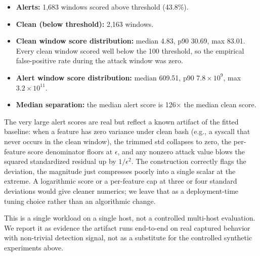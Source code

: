 \begin{itemize}
\item \textbf{Alerts:} 1{,}683 windows scored above threshold (43.8\%).
\item \textbf{Clean (below threshold):} 2{,}163 windows.
\item \textbf{Clean window score distribution:} median 4.83, p90 30.69,
  max 83.01. Every clean window scored well below the 100 threshold,
  so the empirical false-positive rate during the attack window was
  zero.
\item \textbf{Alert window score distribution:} median 609.51, p90
  $7.8 \times 10^{9}$, max $3.2 \times 10^{11}$.
\item \textbf{Median separation:} the median alert score is 126$\times$
  the median clean score.
\end{itemize}

The very large alert scores are real but reflect a known artifact of
the fitted baseline: when a feature has zero variance under clean
bash (e.g., a syscall that never occurs in the clean window), the
trimmed std collapses to zero, the per-feature score denominator
floors at $\epsilon$, and any nonzero attack value blows the squared
standardized residual up by $1/\epsilon^2$. The construction
correctly flags the deviation, the magnitude just compresses
poorly into a single scalar at the extreme. A logarithmic score
or a per-feature cap at three or four standard deviations would
give cleaner numerics; we leave that as a deployment-time tuning
choice rather than an algorithmic change.

This is a single workload on a single host, not a controlled
multi-host evaluation. We report it as evidence the artifact runs
end-to-end on real captured behavior with non-trivial detection
signal, not as a substitute for the controlled synthetic
experiments above.
